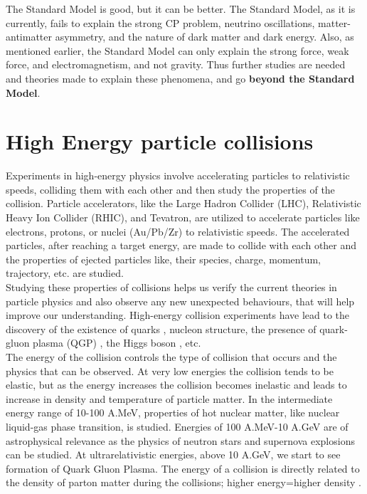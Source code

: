 \documentclass[12pt,a4paper,twoside]{report}
\begin{document}
The Standard Model is good, but it can be better. The Standard Model, as it  is currently, fails to explain the strong CP problem\cite{Ref:CPviolation}, neutrino oscillations\cite{Ref:neutrino-oscill}, matter-antimatter asymmetry\cite{Ref:matter-antimatter-prob}, and the nature of dark matter and dark energy\cite{Ref:dark-matter-y-energy}. Also, as mentioned earlier, the Standard Model can only explain the strong force, weak force, and electromagnetism, and not gravity. Thus further studies are needed and theories made to explain these phenomena, and go \textbf{beyond the Standard Model}.\\
\section{High Energy particle collisions}
Experiments in high-energy physics involve accelerating particles to relativistic speeds, colliding them with each other and then study the properties of the collision. Particle accelerators, like the Large Hadron Collider (LHC), Relativistic Heavy Ion Collider (RHIC), and Tevatron, are utilized to accelerate particles like electrons, protons, or nuclei (Au/Pb/Zr) to relativistic speeds. The accelerated particles, after reaching a target energy, are made to collide with each other and the properties of ejected particles like, their species, charge, momentum, trajectory, etc. are studied.\\
Studying these properties of collisions helps us verify the current theories in particle physics and also observe any new unexpected behaviours, that will help improve our understanding. High-energy collision experiments have lead to the discovery of the existence of quarks \cite{Ref:quarkpaper1}\cite{Ref:quarkpaper2}, nucleon structure, the presence of quark-gluon plasma (QGP) \cite{Ref:QGP-discovery}, the Higgs boson \cite{Ref:higgs-ATLAS}\cite{Ref:higgs-CMS}, etc.\\
The energy of the collision controls the type of collision that occurs and the physics that can be observed. At very low energies the collision tends to be elastic, but as the energy increases the collision becomes inelastic and leads to increase in density and temperature of particle matter. In the intermediate energy range of 10-100 A.MeV, properties of hot nuclear matter, like nuclear liquid-gas phase transition, is studied. Energies of 100 A.MeV-10 A.GeV are of astrophysical relevance as the physics of neutron stars and supernova explosions can be studied. At ultrarelativistic energies, above 10 A.GeV, we start to see formation of Quark Gluon Plasma. The energy of a collision is directly related to the density of parton matter during the collisions; higher energy=higher density \cite{Ref:Csernai}.\\
\end{document}
